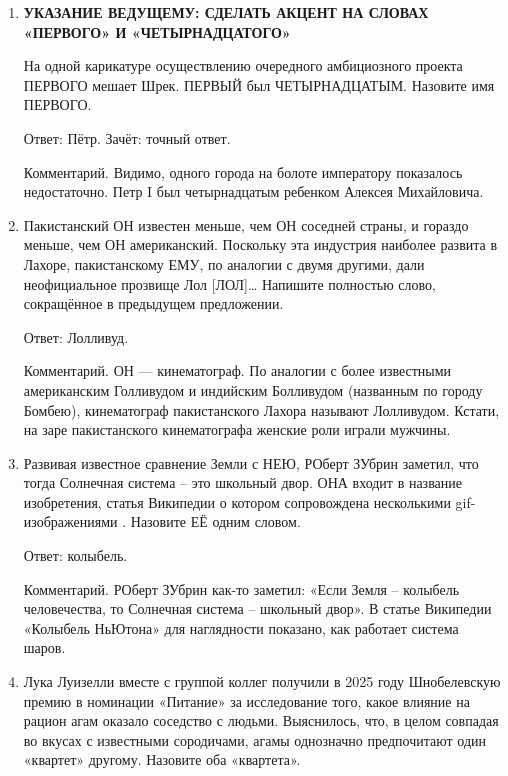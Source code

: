 \documentclass[oneside,final,14pt]{extreport}
\begin{document}
\begin{enumerate}
    Ответ: карты.

    Комментарий. Пржевальский был успешным картёжником, отлично запоминал
    комбинации. Добыв игрой необходимую сумму, карты навсегда оставил. Путешествия Пржевальского позволили составить либо уточнить географические карты Восточной и Центральной Азии.

    \item \textbf{УКАЗАНИЕ ВЕДУЩЕМУ: СДЕЛАТЬ АКЦЕНТ НА СЛОВАХ «ПЕРВОГО» И «ЧЕТЫРНАДЦАТОГО»}

    На одной карикатуре осуществлению очередного амбициозного проекта ПЕРВОГО мешает Шрек. ПЕРВЫЙ был ЧЕТЫРНАДЦАТЫМ. Назовите имя ПЕРВОГО.

    Ответ: Пётр. Зачёт: точный ответ.

    Комментарий. Видимо, одного города на болоте императору показалось недостаточно. Петр I был четырнадцатым ребенком Алексея Михайловича.

    \item Пакистанский ОН известен меньше, чем ОН соседней страны, и гораздо меньше, чем ОН американский. Поскольку эта индустрия наиболее развита в Лахоре, пакистанскому ЕМУ, по аналогии с двумя другими, дали неофициальное прозвище Лол [ЛОЛ]… Напишите полностью слово, сокращённое в предыдущем предложении.

    Ответ: Лолливуд.

    Комментарий. ОН — кинематограф. По аналогии с более известными американским Голливудом и индийским Болливудом (названным по городу Бомбею), кинематограф пакистанского Лахора называют Лолливудом. Кстати, на заре пакистанского кинематографа женские роли играли мужчины.

    \item Развивая известное сравнение Земли с НЕЮ, РОберт ЗУбрин заметил, что тогда Солнечная система – это школьный двор. ОНА входит в название изобретения, статья Википедии о котором сопровождена несколькими gif-изображениями . Назовите ЕЁ одним словом.

    Ответ: колыбель.

    Комментарий. РОберт ЗУбрин как-то заметил: «Если Земля – колыбель человечества, то Солнечная система – школьный двор». В статье Википедии «Колыбель НьЮтона» для наглядности показано, как работает система шаров.

    \item Лука Луизелли вместе с группой коллег получили в 2025 году Шнобелевскую премию в номинации «Питание» за исследование того, какое влияние на рацион агам оказало соседство с людьми. Выяснилось, что, в целом совпадая во вкусах с известными сородичами, агамы однозначно предпочитают один «квартет» другому. Назовите оба «квартета».


\end{enumerate}
\end{document}
